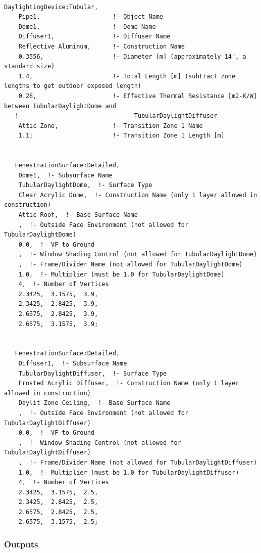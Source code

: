 \begin{lstlisting}

DaylightingDevice:Tubular,
    Pipe1,                    !- Object Name
    Dome1,                    !- Dome Name
    Diffuser1,                !- Diffuser Name
    Reflective Aluminum,      !- Construction Name
    0.3556,                   !- Diameter [m] (approximately 14", a standard size)
    1.4,                      !- Total Length [m] (subtract zone lengths to get outdoor exposed length)
    0.28,                     !- Effective Thermal Resistance [m2-K/W] between TubularDaylightDome and
   !                                TubularDaylightDiffuser
    Attic Zone,               !- Transition Zone 1 Name
    1.1;                      !- Transition Zone 1 Length [m]


   FenestrationSurface:Detailed,
    Dome1,  !- Subsurface Name
    TubularDaylightDome,  !- Surface Type
    Clear Acrylic Dome,  !- Construction Name (only 1 layer allowed in construction)
    Attic Roof,  !- Base Surface Name
    ,  !- Outside Face Environment (not allowed for TubularDaylightDome)
    0.0,  !- VF to Ground
    ,  !- Window Shading Control (not allowed for TubularDaylightDome)
    ,  !- Frame/Divider Name (not allowed for TubularDaylightDome)
    1.0,  !- Multiplier (must be 1.0 for TubularDaylightDome)
    4,  !- Number of Vertices
    2.3425,  3.1575,  3.9,
    2.3425,  2.8425,  3.9,
    2.6575,  2.8425,  3.9,
    2.6575,  3.1575,  3.9;


   FenestrationSurface:Detailed,
    Diffuser1,  !- Subsurface Name
    TubularDaylightDiffuser,  !- Surface Type
    Frosted Acrylic Diffuser,  !- Construction Name (only 1 layer allowed in construction)
    Daylit Zone Ceiling,  !- Base Surface Name
    ,  !- Outside Face Environment (not allowed for TubularDaylightDiffuser)
    0.0,  !- VF to Ground
    ,  !- Window Shading Control (not allowed for TubularDaylightDiffuser)
    ,  !- Frame/Divider Name (not allowed for TubularDaylightDiffuser)
    1.0,  !- Multiplier (must be 1.0 for TubularDaylightDiffuser)
    4,  !- Number of Vertices
    2.3425,  3.1575,  2.5,
    2.3425,  2.8425,  2.5,
    2.6575,  2.8425,  2.5,
    2.6575,  3.1575,  2.5;
\end{lstlisting}

\subsubsection{Outputs}\label{outputs-2-004}


